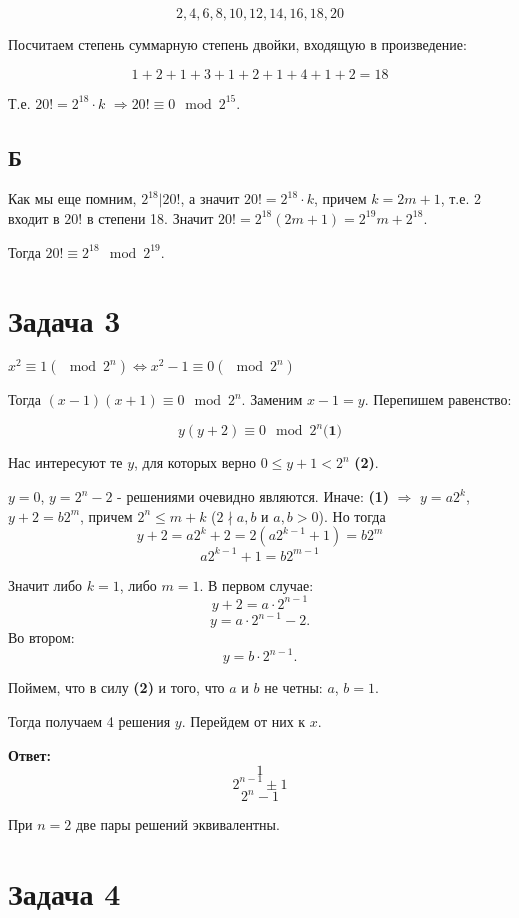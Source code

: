 \documentclass{article}
\begin{document}
	$$2, 4, 6, 8, 10, 12, 14, 16, 18, 20$$
	
	Посчитаем степень суммарную степень двойки, входящую в произведение:
	
	$$1 + 2 + 1 + 3 + 1 + 2 + 1 + 4 + 1 + 2 = 18$$
	
	Т.е. $20! = 2^{18} \cdot k$  $\Rightarrow 20! \equiv 0 \mod 2^{15}$.
	
	\subsection{Б}
	
	Как мы еще помним, $2^{18} | 20!$, а значит $20! = 2^{18} \cdot k$, причем $k = 2m + 1$, т.е. 2 входит в $20!$ в степени 18. Значит $20! = 2^{18} (2m + 1) = 2^{19}m + 2^{18}$.
	
	Тогда $20! \equiv 2^{18} \mod 2^{19}$.
	
	\section{Задача 3}
	
	$x^2 \equiv 1 (\mod 2^n) \Leftrightarrow x^2 - 1 \equiv 0 (\mod 2^n)$
	
	Тогда $(x - 1)(x + 1) \equiv 0 \mod 2^n$. Заменим $x - 1 = y$. Перепишем равенство:
	
	$$ y(y + 2) \equiv 0 \mod 2^n  \textbf{(1)}$$
	
	Нас интересуют те $y$, для которых верно $0 \leqslant y + 1 < 2^n $ \textbf{(2)}.
	 
	$y = 0$, $y = 2^n - 2$ - решениями очевидно являются. Иначе: \textbf{(1)} $\Rightarrow$ $y = a2^k$, $y + 2 = b2^m$, причем $2^n \leqslant m + k$ ($2\nmid a,b$ и $a,b > 0$). Но тогда
	$$y + 2 = a2^k + 2 = 2(a2^{k-1} + 1) = b2^m$$
	$$a2^{k - 1} + 1 = b2^{m - 1}$$ 
	
	Значит либо $k = 1$, либо $m = 1$. В первом случае: 
	$$y + 2 = a\cdot2^{n - 1}$$ 
	$$y = a\cdot2^{n - 1} - 2.$$
	Во втором: $$y=b\cdot2^{n - 1}.$$ 
	
	Поймем, что в силу \textbf{(2)} и того, что $a$ и $b$ не четны: $a$, $b = 1$.
	
	Тогда получаем 4 решения $y$. Перейдем от них к $x$.
	
	\textbf{Ответ:} $$1$$
	$$2^{n - 1} \pm 1$$
	$$2^n - 1$$
	
	При $n=2$ две пары решений эквивалентны.
	
	\section{Задача 4}
	
\end{document}
